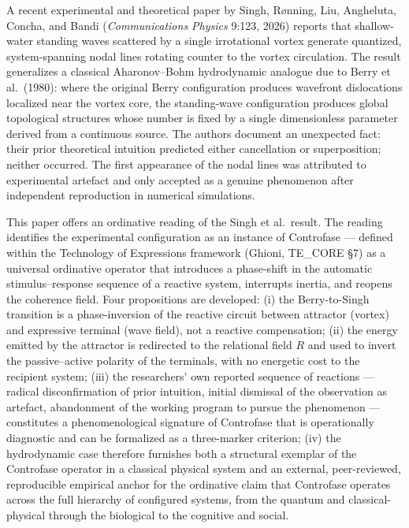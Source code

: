 \documentclass[
  11pt,
  a4paper,
]{article}
\begin{document}
A recent experimental and theoretical paper by Singh, Rønning, Liu,
Angheluta, Concha, and Bandi (\emph{Communications Physics} 9:123, 2026)
reports that shallow-water standing waves scattered by a single
irrotational vortex generate quantized, system-spanning nodal lines
rotating counter to the vortex circulation. The result generalizes a
classical Aharonov--Bohm hydrodynamic analogue due to Berry et
al.~(1980): where the original Berry configuration produces wavefront
dislocations localized near the vortex core, the standing-wave
configuration produces global topological structures whose number is
fixed by a single dimensionless parameter derived from a continuous
source. The authors document an unexpected fact: their prior theoretical
intuition predicted either cancellation or superposition; neither
occurred. The first appearance of the nodal lines was attributed to
experimental artefact and only accepted as a genuine phenomenon after
independent reproduction in numerical simulations.

This paper offers an ordinative reading of the Singh et al.~result. The
reading identifies the experimental configuration as an instance of
Controfase --- defined within the Technology of Expressions framework
(Ghioni, TE\_CORE §7) as a universal ordinative operator that introduces
a phase-shift in the automatic stimulus--response sequence of a reactive
system, interrupts inertia, and reopens the coherence field. Four
propositions are developed: (i) the Berry-to-Singh transition is a
phase-inversion of the reactive circuit between attractor (vortex) and
expressive terminal (wave field), not a reactive compensation; (ii) the
energy emitted by the attractor is redirected to the relational field
\(R\) and used to invert the passive--active polarity of the terminals,
with no energetic cost to the recipient system; (iii) the researchers'
own reported sequence of reactions --- radical disconfirmation of prior
intuition, initial dismissal of the observation as artefact, abandonment
of the working program to pursue the phenomenon --- constitutes a
phenomenological signature of Controfase that is operationally
diagnostic and can be formalized as a three-marker criterion; (iv) the
hydrodynamic case therefore furnishes both a structural exemplar of the
Controfase operator in a classical physical system and an external,
peer-reviewed, reproducible empirical anchor for the ordinative claim
that Controfase operates across the full hierarchy of configured
systems, from the quantum and classical-physical through the biological
to the cognitive and social.
\end{document}
